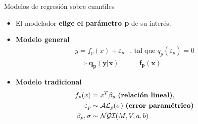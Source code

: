 \documentclass{beamer}
\begin{document}
\begin{frame}{Modelos de regresi\'on sobre cuantiles}{}
  \begin{itemize}
  \setlength\itemsep{2em}
      \item{El modelador \textbf{elige el par\'ametro p} de su inter\'es.}
      \item {
      \textbf{Modelo general}
      \begin{equation*}
      \begin{aligned}
          y = f_p(x) + \varepsilon_p
          &\text{, tal que }q_p(\varepsilon_p) = 0\\
          \implies \mathbf{q_p(y|x)} &= \mathbf{f_p(x)}
      \end{aligned}
      \end{equation*}
      }
      \item{
      \textbf{Modelo tradicional}
      \begin{equation*}
      \begin{aligned}
        f_p(x) &= x^T\beta_p \text{ \textbf{(relaci\'on lineal)}},\\
        \varepsilon_p &\sim \mathcal{AL}_p(\sigma) \text{ \textbf{(error param\'etrico)}} \\
        \beta_p,\sigma &\sim \mathcal{NGI}(M,V,a,b)
      \end{aligned}
      \end{equation*}
      }
  \end{itemize}
\end{frame}


\end{document}
